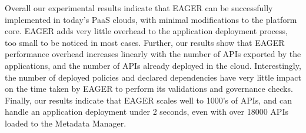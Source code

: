 Overall our experimental results indicate that EAGER can be successfully implemented in today's PaaS clouds, with minimal modifications to the platform core.
EAGER adds very little overhead to the application deployment process, too small to be noticed in most cases. Further, our results show that EAGER
performance overhead increases linearly with the number of APIs exported by the applications, and the number of APIs already deployed in the cloud. 
Interestingly, the number of deployed policies and declared dependencies
have very little impact on the time taken by EAGER to perform its validations and governance checks. Finally, our results indicate that EAGER scales
well to 1000's of APIs, and can handle an application deployment under 2 seconds, even with over 18000 APIs loaded to the Metadata Manager.